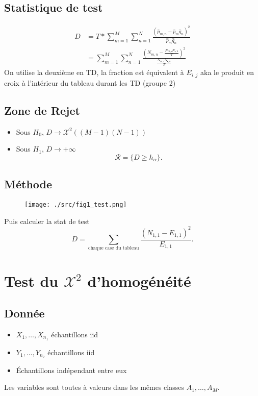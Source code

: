 \documentclass{article}
\theoremstyle{plain}%
\theoremstyle{definition}
\theoremstyle{remark}
\begin{document}
\subsection*{Statistique de test}
    \begin{align*}
        D &= T * \sum_{m=1}^{M}\sum_{n=1}^{N}\frac{(\hat{p}_{m,n} - \hat{p}_m \hat{q}_n)^2}{\hat{p}_m \hat{q}_n} \\
            &= \sum_{m=1}^{M}\sum_{n=1}^{N}\frac{( N_{m,n} - \frac{N_{m, \centerdot} N_{\centerdot, n}}{T})^2}{\frac{N_{m, \centerdot} N_{\centerdot, n}}{T}}
    \end{align*}
    On utilise la deuxième en TD, la fraction est équivalent à $ E_{i,j} $ aka le produit en croix à l'intérieur du tableau durant les TD (groupe 2)

\subsection*{Zone de Rejet}
\begin{itemize}
    \item Sous $ H_0 $, $ D \to \mathcal{X}^2 ((M-1)(N-1))  $
    \item Sous $ H_1 $, $ D \to +\infty  $
    \[
        \mathcal{R} = \{D \geq h_\alpha \}
    .\]
\end{itemize}

\subsection*{Méthode}
\begin{figure}[!h]
    \centering
    \texttt{[image: ./src/fig1\_test.png]}
\end{figure}
Puis calculer la stat de test 
\[
    D = \sum_{\text{chaque case du tableau}}\frac{(N_{1,1}- E_{1,1})^2}{E_{1,1}}
.\]


\section{Test du $ \mathcal{X}^2 $ d'homogénéité}
\subsection*{Donnée}
\begin{itemize}
    \item $ X_1, \dots, X_{n_1} $ échantillons iid
    \item $ Y_1, \dots, Y_{n_2} $ échantillons iid
    \item Échantillons indépendant entre eux
\end{itemize}
Les variables sont toutes à valeurs dans les mêmes classes $ A_1, \dots, A_M $.
\end{document}
